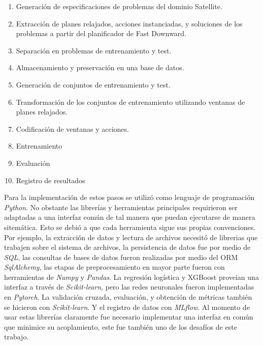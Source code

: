 \begin{enumerate}
    \item Generación de especificaciones de problemas del dominio Satellite.
    \item Extracción de planes relajados, acciones instanciadas, y soluciones de
    los problemas a partir del planificador de Fast Downward.
    \item Separación en problemas de entrenamiento y test.
    \item Almacenamiento y preservación en una base de datos.
    \item Generación de conjuntos de entrenamiento y test.
    \item Transformación de los conjuntos de entrenamiento utilizando ventanas
    de planes relajados.
    \item Codificación de ventanas y acciones.
    \item Entrenamiento
    \item Evaluación
    \item Registro de resultados
\end{enumerate}

Para la implementación de estos pasos se utilizó como lenguaje de programación
\emph{Python}. No obstante las librerías y herramientas principales requirieron
ser adaptadas a una interfaz común de tal manera que puedan ejecutarse de manera
sitemática. Esto se debió a que cada herramienta sigue sus propias convenciones.
Por ejemplo, la extracción de datos y lectura de archivos necesitó de librerias
que trabajen sobre el sistema de archivos, la persistencia de datos fue por
medio de \emph{SQL}, las consultas de bases de datos fueron realizadas por medio
del ORM \emph{SqlAlchemy}, las etapas de preprocesamiento en mayor parte fueron
con herramientas de \emph{Numpy} y \emph{Pandas}. La regresión logística y
XGBoost proveian una interfaz a través de \emph{Scikit-learn}, pero las redes
neuronales fueron implementadas en \emph{Pytorch}. La validación cruzada,
evaluación, y obtención de métricas también se hicieron con \emph{Scikit-learn}.
Y el registro de datos con \emph{MLflow}. Al momento de usar estas librerías
claramente fue necesario implementar una interfaz en común que minimice su
acoplamiento, este fue también uno de los desafíos de este trabajo.